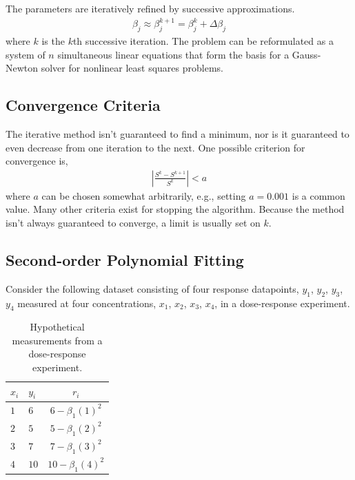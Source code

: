 The parameters are iteratively refined by successive approximations.
\begin{align}
\beta_{j} \approx \beta_{j}^{k + 1} = \beta_{j}^{k} + \Delta\beta_{j}
\end{align}
where \(k\) is the \(k\)th successive iteration. 
The problem can be reformulated as a system of \(n\) simultaneous linear equations that
form the basis for a Gauss-Newton solver for nonlinear least squares problems.

\subsection{Convergence Criteria}

The iterative method isn't guaranteed to find a minimum, 
nor is it guaranteed to even decrease from one iteration to the next. 
One possible criterion for convergence is,
\begin{align}
\left| \frac{S^{k} - S^{k + 1}}{S^{k}} \right| < a
\end{align}
where \(a\) can be chosen somewhat arbitrarily, 
e.g., setting \(a=0.001\) is a common value. 
Many other criteria exist for stopping the algorithm. 
Because the method isn't always guaranteed to converge, 
a limit is usually set on \(k\).

\subsection{Second-order Polynomial Fitting}

Consider the following dataset consisting of four response datapoints,
\(y_{1}\), \(y_{2}\), \(y_{3}\), \(y_{4}\) measured at four concentrations,
\(x_{1}\), \(x_{2}\), \(x_{3}\), \(x_{4}\), 
in a dose-response experiment.

\begin{table}[h!]
\centering
\begin{tabular}{| l | l | c |}
\hline
$x_{i}$  & $y_{i}$ & $r_{i}$\\\hline
\(1\) & \(6\) & \(6 - \beta_{1}(1)^{2}\) \\
\(2\) & \(5\) & \(5 - \beta_{1}(2)^{2}\) \\
\(3\) & \(7\) & \(7 - \beta_{1}(3)^{2}\) \\
\(4\) & \(10\) & \(10 - \beta_{1}(4)^{2}\) \\\hline
\end{tabular}
\caption{%
Hypothetical measurements from a dose-response experiment.
}
\label{tab:residuals}
\end{table}

